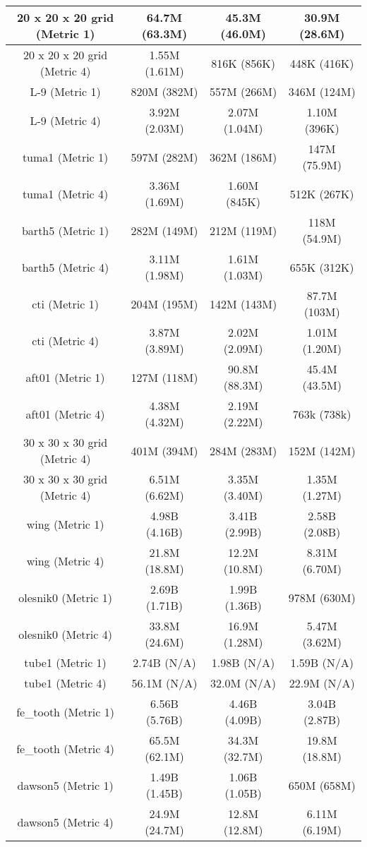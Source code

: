 \documentclass{sig-alternate}
\begin{document}
\begin{table*}[htb!]
{\begin{tabular}{|c|c|c|c|}
20 x 20 x 20 grid (Metric 1) & 64.7M (63.3M) & 45.3M (46.0M) & 30.9M (28.6M) \\\hline
20 x 20 x 20 grid (Metric 4) & 1.55M (1.61M) & 816K (856K) & 448K (416K) \\\hline
L-9 (Metric 1) & 820M (382M) & 557M (266M)& 346M (124M) \\\hline
L-9 (Metric 4) & 3.92M (2.03M) & 2.07M (1.04M) & 1.10M (396K) \\\hline
tuma1 (Metric 1) & 597M (282M) & 362M (186M) & 147M (75.9M) \\\hline
tuma1 (Metric 4) & 3.36M (1.69M) & 1.60M (845K) & 512K (267K) \\\hline
barth5 (Metric 1) & 282M (149M) & 212M (119M) & 118M (54.9M) \\\hline
barth5 (Metric 4) & 3.11M (1.98M) & 1.61M (1.03M) & 655K (312K) \\\hline
cti (Metric 1) & 204M (195M) & 142M (143M) & 87.7M (103M) \\\hline
cti (Metric 4) & 3.87M (3.89M) & 2.02M (2.09M) & 1.01M (1.20M) \\\hline
aft01 (Metric 1) & 127M (118M) & 90.8M (88.3M) & 45.4M (43.5M) \\\hline
aft01 (Metric 4) & 4.38M (4.32M) & 2.19M (2.22M) & 763k (738k) \\\hline
30 x 30 x 30 grid (Metric 4) & 401M (394M) & 284M (283M) & 152M (142M) \\\hline
30 x 30 x 30 grid (Metric 4) & 6.51M (6.62M) & 3.35M (3.40M) & 1.35M (1.27M) \\\hline
wing (Metric 1) & 4.98B (4.16B) & 3.41B (2.99B) & 2.58B (2.08B) \\\hline
wing (Metric 4) & 21.8M (18.8M) & 12.2M (10.8M) & 8.31M (6.70M) \\\hline
olesnik0 (Metric 1) & 2.69B (1.71B) & 1.99B (1.36B) & 978M (630M) \\\hline
olesnik0 (Metric 4) & 33.8M (24.6M) & 16.9M (1.28M) & 5.47M (3.62M) \\\hline
tube1 (Metric 1) & 2.74B (N/A) & 1.98B (N/A) & 1.59B (N/A) \\\hline
tube1 (Metric 4) & 56.1M (N/A) & 32.0M (N/A) & 22.9M (N/A) \\\hline
fe\_tooth (Metric 1) & 6.56B (5.76B) & 4.46B (4.09B) & 3.04B (2.87B) \\\hline
fe\_tooth (Metric 4) & 65.5M (62.1M) & 34.3M (32.7M) & 19.8M (18.8M) \\\hline
dawson5 (Metric 1) & 1.49B (1.45B) & 1.06B (1.05B) & 650M (658M) \\\hline
dawson5 (Metric 4) & 24.9M (24.7M) & 12.8M (12.8M) & 6.11M (6.19M) \\\hline


\end{tabular}}
\end{table*}
\end{document}
